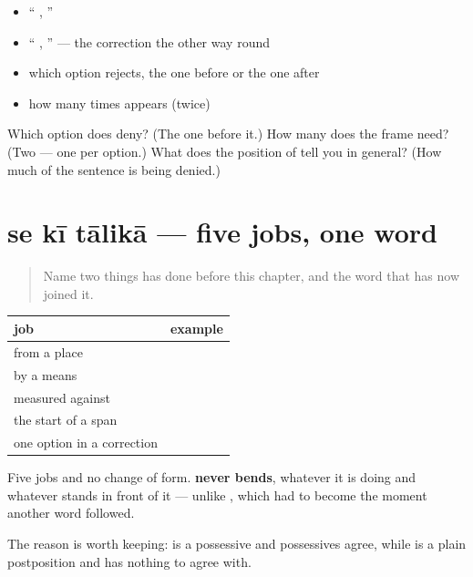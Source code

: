 \begin{itemize}
\raggedright
  \item \textquotedblleft{}  ,  \textquotedblright{}
  \item \textquotedblleft{}  ,  \textquotedblright{} — the correction the other way round
  \item which option \textbf{} rejects, the one before or the one after
  \item how many times \textbf{} appears (twice)
\end{itemize}

\begin{tcolorbox}[breakable,colback=teal!4,colframe=teal!35!black,title={Before you move on}]
Which option does \textbf{} deny? (The one before it.) How many \textbf{} does the frame need? (Two — one per option.) What does the position of \textbf{} tell you in general? (How much of the sentence is being denied.)
\end{tcolorbox}
\section[\texorpdfstring{\hi{से} \hi{की} \hi{तालिका} (se kī tālikā)}{से की तालिका (se kī tālikā)}]{se kī tālikā — five jobs, one word}

\label{lesson:HI-C94-repaso-safar}



\begin{quote}
Name two things \textbf{} has done before this chapter, and the word that has now joined it.
\end{quote}

\begin{grammarlens}[title={Grammar Lens: everything \hi{से} does}]
\noindent
\begin{tabularx}{\linewidth}{@{}>{\raggedright\arraybackslash}X>{\raggedright\arraybackslash}X@{}}
\toprule
\textbf{job} & \textbf{example} \\
\midrule
from a place & \hi{स्टेशन} \hi{से} \\
by a means & \hi{ट्रेन} \hi{से} \\
measured against & \hi{बच्चे} \hi{से} \hi{बड़ा} \\
the start of a span & \hi{सोमवार} \hi{से} \\
one option in a correction & \hi{बस} \hi{से} \hi{नहीं} \\
\bottomrule
\end{tabularx}

Five jobs and no change of form. \textbf{ never bends}, whatever it is doing and whatever stands in front of it — unlike \textbf{}, which had to become \textbf{} the moment another word followed.

The reason is worth keeping: \textbf{} is a possessive and possessives agree, while \textbf{} is a plain postposition and has nothing to agree with.
\end{grammarlens}

